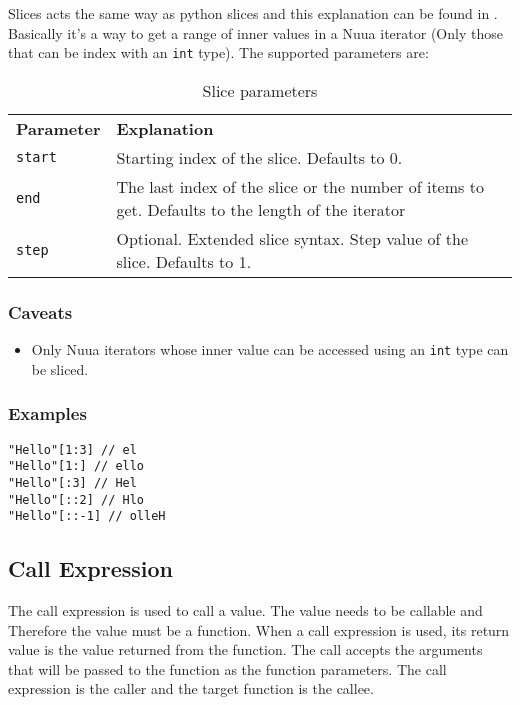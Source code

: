 Slices acts the same way as python slices and this explanation can be found in \autocite{python_right_way}. Basically it's a way to
get a range of inner values in a Nuua iterator (Only those that can be index with an \texttt{int} type).
The supported parameters are:

\begin{table}[H]
    \centering
    \begin{tabular}{ l p{7.5cm} }
        \textbf{Parameter} & \textbf{Explanation} \\
        \texttt{start} & Starting index of the slice. Defaults to 0.\\
        \texttt{end} & The last index of the slice or the number of items to get. Defaults to the length of the iterator\\
        \texttt{step} & Optional. Extended slice syntax. Step value of the slice. Defaults to 1.\\
    \end{tabular}
    \caption{Slice parameters}
    \label{fig:slice_parameters}
\end{table}

\subsubsection{Caveats}

\begin{itemize}
    \item Only Nuua iterators whose inner value can be accessed using an \texttt{int} type can be sliced.
\end{itemize}

\subsubsection{Examples}

\begin{lstlisting}
"Hello"[1:3] // el
"Hello"[1:] // ello
"Hello"[:3] // Hel
"Hello"[::2] // Hlo
"Hello"[::-1] // olleH
\end{lstlisting}

\subsection{Call Expression}

The call expression is used to call a value. The value needs to be callable and Therefore the value must be a function.
When a call expression is used, its return value is the value returned from the function. The call accepts the arguments
that will be passed to the function as the function parameters.
The call expression is the caller and the target function is the callee.

